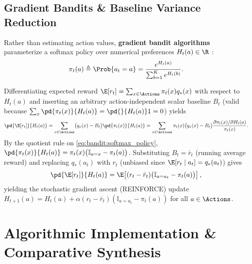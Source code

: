 \documentclass[../../../../master.tex]{subfiles}
\begin{document}
\subsection{Gradient Bandits \& Baseline Variance Reduction}

Rather than estimating action values, \textbf{gradient bandit algorithms} parameterize a softmax policy over numerical preferences $H_t(a) \in \R$ :
\begin{equation}
  \pi_t(a) \triangleq \Prob\{a_t = a\} = \frac{e^{H_t(a)}}{\sum_{b=1}^K e^{H_t(b)}}.
  \label{eq:bandit:softmax_policy}
\end{equation}

\begin{coremath}
Differentiating expected reward $\E[r_t] = \sum_{x \in \Actions} \pi_t(x) q_*(x)$ with respect to $H_t(a)$ and inserting an arbitrary action-independent scalar baseline $B_t$ (valid because $\sum_x \pd{\pi_t(x)}{H_t(a)} = \pd{}{H_t(a)} 1 = 0$) yields
\begin{equation}
  \pd{\E[r_t]}{H_t(a)}
  = \sum_{x \in \Actions} \bigl(q_*(x) - B_t\bigr) \pd{\pi_t(x)}{H_t(a)}
  = \sum_{x \in \Actions} \pi_t(x) \bigl(q_*(x) - B_t\bigr) \frac{\partial \pi_t(x)/\partial H_t(a)}{\pi_t(x)}.
\end{equation}
By the quotient rule on \eqref{eq:bandit:softmax_policy}, $\pd{\pi_t(x)}{H_t(a)} = \pi_t(x)\bigl(\mathbb{I}_{a=x} - \pi_t(a)\bigr)$. Substituting $B_t = \bar{r}_t$ (running average reward) and replacing $q_*(a_t)$ with $r_t$ (unbiased since $\E[r_t \mid a_t] = q_*(a_t)$) gives
\begin{equation}
  \pd{\E[r_t]}{H_t(a)} = \E\!\left[(r_t - \bar{r}_t)\bigl(\mathbb{I}_{a=a_t} - \pi_t(a)\bigr)\right],
  \label{eq:bandit:grad_bandit_sga}
\end{equation}
yielding the stochastic gradient ascent (REINFORCE) update $H_{t+1}(a) = H_t(a) + \alpha(r_t - \bar{r}_t)(\mathbb{I}_{a=a_t} - \pi_t(a))$ for all $a \in \Actions$.
\end{coremath}

\section{Algorithmic Implementation \& Comparative Synthesis}
\label{sec:bandit:algorithms}
\end{document}
